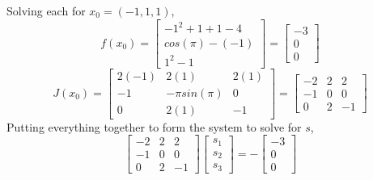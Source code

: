\documentclass[12pt]{article}
\makeatletter
\theoremstyle{homework}
\newenvironment{exercise}[1]
{\def\@currentlabel{#1}\exercisecore}
{\endexercisecore}
\makeatother
\begin{document}
\begin{exercise}{P5}
\begin{enumerate}[a.]
          Solving each for $x_0 = (-1,1,1)$,
          \begin{equation*}
            f(x_0) =
            \begin{bmatrix}
              -1^2 +1 + 1 - 4 \\
              cos(\pi) -(-1)  \\
              1^2 - 1
            \end{bmatrix}
            =
            \begin{bmatrix}
              -3 \\
              0  \\
              0
            \end{bmatrix}
          \end{equation*}
          \begin{equation*}
            J(x_0) =
            \begin{bmatrix}
              2(-1) & 2(1)          & 2(1) \\
              -1    & -\pi sin(\pi) & 0    \\
              0     & 2(1)          & -1
            \end{bmatrix}
            =
            \begin{bmatrix}
              -2 & 2 & 2  \\
              -1 & 0 & 0  \\
              0  & 2 & -1
            \end{bmatrix}
          \end{equation*}
          Putting everything together to form the system to solve for $s$,
          \begin{equation*}
            \begin{bmatrix}
              -2 & 2 & 2  \\
              -1 & 0 & 0  \\
              0  & 2 & -1
            \end{bmatrix}
            \begin{bmatrix}
              s_1 \\
              s_2 \\
              s_3
            \end{bmatrix}
            = -
            \begin{bmatrix}
              -3 \\
              0  \\
              0
            \end{bmatrix}
          \end{equation*}
          \vspace{.15in}


\end{enumerate}
\end{exercise}
\end{document}
